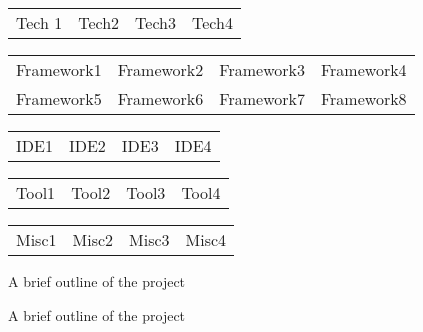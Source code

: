 \documentclass[a4paper,11.9pt]{memoir}
\begin{document}
{\begin{tabular}{p{} p{} p{} p{} }
	\bluebullet Tech 1 &  \bluebullet Tech2  &  \bluebullet Tech3 &  \bluebullet Tech4
	\end{tabular}}


{\begin{tabular}{p{} p{} p{} p{}}
	\bluebullet Framework1 &  \bluebullet Framework2 & \bluebullet Framework3 & \bluebullet Framework4 
	\\ %
	\bluebullet Framework5 &  \bluebullet Framework6 & \bluebullet Framework7 & \bluebullet Framework8
	\end{tabular}}

{\begin{tabular}{p{} p{} p{} p{}}
	\bluebullet IDE1 &  \bluebullet IDE2 & \bluebullet IDE3 & \bluebullet IDE4
	\end{tabular}}

{\begin{tabular}{p{} p{} p{} p{}}
	\bluebullet Tool1 &  \bluebullet Tool2 & \bluebullet Tool3 & \bluebullet Tool4
	\end{tabular}}

{\begin{tabular}{p{} p{} p{} p{}}
	\bluebullet Misc1 &  \bluebullet Misc2 & \bluebullet Misc3 & \bluebullet Misc4
	
	\end{tabular}}



{A brief outline of the project}

\Sep %

{A brief outline of the project}


\end{document}
